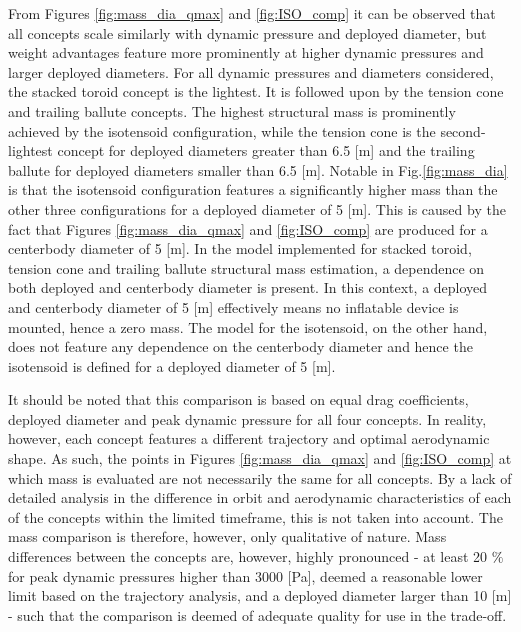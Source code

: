 From Figures \ref{fig:mass_dia_qmax} and \ref{fig:ISO_comp} it can be observed that all concepts scale similarly with dynamic pressure and deployed diameter, but weight advantages feature more prominently at higher dynamic pressures and larger deployed diameters. For all dynamic pressures and diameters considered, the stacked toroid concept is the lightest. It is followed upon by the tension cone and trailing ballute concepts. The highest structural mass is prominently achieved by the isotensoid configuration, while the tension cone is the second-lightest concept for deployed diameters greater than 6.5 [m] and the trailing ballute for deployed diameters smaller than 6.5 [m]. Notable in Fig.\ref{fig:mass_dia} is that the isotensoid configuration features a significantly higher mass than the other three configurations for a deployed diameter of 5 [m]. This is caused by the fact that Figures \ref{fig:mass_dia_qmax} and \ref{fig:ISO_comp} are produced for a centerbody diameter of 5 [m]. In the model implemented for stacked toroid, tension cone and trailing ballute \cite{Samareh2011} structural mass estimation, a dependence on both deployed and centerbody diameter is present. In this context, a deployed and centerbody diameter of 5 [m] effectively means no inflatable device is mounted, hence a zero mass. The model for the isotensoid, on the other hand, \cite{Anderson1969} does not feature any dependence on the centerbody diameter and hence the isotensoid is defined for a deployed diameter of 5 [m].

It should be noted that this comparison is based on equal drag coefficients, deployed diameter and peak dynamic pressure for all four concepts. In reality, however, each concept features a different trajectory and optimal aerodynamic shape. As such, the points in Figures \ref{fig:mass_dia_qmax} and \ref{fig:ISO_comp} at which mass is evaluated are not necessarily the same for all concepts. By a lack of detailed analysis in the difference in orbit and aerodynamic characteristics of each of the concepts within the limited timeframe, this is not taken into account. The mass comparison is therefore, however, only qualitative of nature. Mass differences between the concepts are, however, highly pronounced - at least 20 $\%$ for peak dynamic pressures higher than 3000 [Pa], deemed a reasonable lower limit based on the trajectory analysis, and a deployed diameter larger than 10 [m] - such that the comparison is deemed of adequate quality for use in the trade-off.


